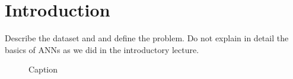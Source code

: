 \section{Introduction}

Describe the dataset and and define the problem. Do not explain in detail the basics of ANNs as we did in the introductory lecture.


\citep{Goodfellow-et-al-2016}

\cite{hope2017, chollet2018}


\begin{figure}[H]
    \centering
    \caption{Caption}
    \label{fig:my_label}
\end{figure}

























